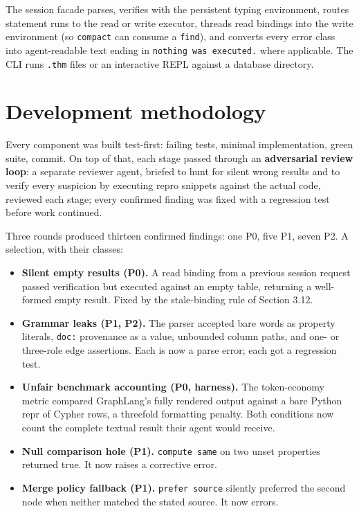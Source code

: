\documentclass[11pt]{article}
\begin{document}
The session facade parses, verifies with the persistent typing environment, routes statement runs to the read or write executor, threads read bindings into the write environment (so \texttt{compact} can consume a \texttt{find}), and converts every error class into agent-readable text ending in \texttt{nothing was executed.} where applicable. The CLI runs \texttt{.thm} files or an interactive REPL against a database directory.

\section{Development methodology}\label{sec:method}

Every component was built test-first: failing tests, minimal implementation, green suite, commit. On top of that, each stage passed through an \textbf{adversarial review loop}: a separate reviewer agent, briefed to hunt for silent wrong results and to verify every suspicion by executing repro snippets against the actual code, reviewed each stage; every confirmed finding was fixed with a regression test before work continued.

Three rounds produced thirteen confirmed findings: one P0, five P1, seven P2. A selection, with their classes:

\begin{itemize}[leftmargin=1.6em,itemsep=2pt]
  \item \textbf{Silent empty results (P0).} A read binding from a previous session request passed verification but executed against an empty table, returning a well-formed empty result. Fixed by the stale-binding rule of Section 3.12.
  \item \textbf{Grammar leaks (P1, P2).} The parser accepted bare words as property literals, \texttt{doc:} provenance as a value, unbounded column paths, and one- or three-role edge assertions. Each is now a parse error; each got a regression test.
  \item \textbf{Unfair benchmark accounting (P0, harness).} The token-economy metric compared GraphLang's fully rendered output against a bare Python repr of Cypher rows, a threefold formatting penalty. Both conditions now count the complete textual result their agent would receive.
  \item \textbf{Null comparison hole (P1).} \texttt{compute same} on two unset properties returned true. It now raises a corrective error.
  \item \textbf{Merge policy fallback (P1).} \texttt{prefer source} silently preferred the second node when neither matched the stated source. It now errors.
\end{itemize}
\end{document}
